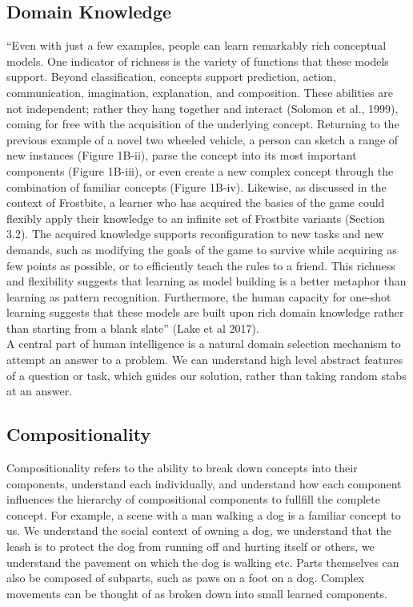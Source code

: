\documentclass[11pt, a4paper]{article}
\begin{document}
\subsection{Domain Knowledge}
``Even with just a few examples, people can learn remarkably rich conceptual models. One indicator of richness is the variety of functions that these models support. Beyond classification, concepts support prediction, action, communication, imagination, explanation, and composition. These abilities
are not independent; rather they hang together and interact (Solomon et al., 1999), coming for free with the acquisition of the underlying concept. Returning to the previous example of a novel two wheeled vehicle, a person can sketch a range of new instances (Figure 1B-ii), parse the concept into
its most important components (Figure 1B-iii), or even create a new complex concept through the combination of familiar concepts (Figure 1B-iv). Likewise, as discussed in the context of Frostbite, a learner who has acquired the basics of the game could flexibly apply their knowledge to an infinite set of Frostbite variants (Section 3.2). The acquired knowledge supports reconfiguration to new tasks and new demands, such as modifying the goals of the game to survive while acquiring as few points as possible, or to efficiently teach the rules to a friend. This richness and flexibility suggests that learning as model building is a better metaphor than learning as pattern recognition. Furthermore, the human capacity for one-shot learning suggests that these models are built upon rich domain knowledge rather than starting from a blank slate'' (Lake et al 2017). \\

A central part of human intelligence is a natural domain selection mechanism to attempt an answer to a problem. We can understand high level abstract features of a question or task, which guides our solution, rather than taking random stabs at an answer.


\subsection{Compositionality}
Compositionality refers to the ability to break down concepts into their components, understand each individually, and understand how each component influences the hierarchy of compositional components to fullfill the complete concept. For example, a scene with a man walking a dog is a familiar concept to us. We understand the social context of owning a dog, we understand that the leash is to protect the dog from running off and hurting itself or others, we understand the pavement on which the dog is walking etc. Parts themselves can also be composed of subparts, such as paws on a foot on a dog. Complex movements can be thought of as broken down into small learned components.
\end{document}
